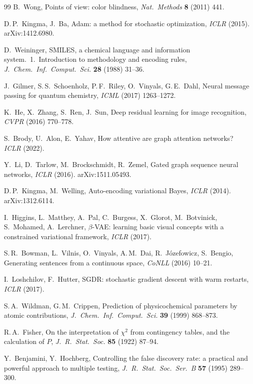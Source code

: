 \documentclass[10pt,a4paper,twocolumn]{article}
\begin{document}
\begin{thebibliography}{99}
B.~Wong,
Points of view: color blindness,
\textit{Nat.\ Methods} \textbf{8} (2011) 441.

D.\,P.~Kingma, J.~Ba,
Adam: a method for stochastic optimization,
\textit{ICLR} (2015). arXiv:1412.6980.

D.~Weininger,
SMILES, a chemical language and information system.\ 1.\ Introduction to methodology and encoding rules,
\textit{J.\ Chem.\ Inf.\ Comput.\ Sci.} \textbf{28} (1988) 31--36.

J.~Gilmer, S.\,S.~Schoenholz, P.\,F.~Riley, O.~Vinyals, G.\,E.~Dahl,
Neural message passing for quantum chemistry,
\textit{ICML} (2017) 1263--1272.

K.~He, X.~Zhang, S.~Ren, J.~Sun,
Deep residual learning for image recognition,
\textit{CVPR} (2016) 770--778.

S.~Brody, U.~Alon, E.~Yahav,
How attentive are graph attention networks?
\textit{ICLR} (2022).

Y.~Li, D.~Tarlow, M.~Brockschmidt, R.~Zemel,
Gated graph sequence neural networks,
\textit{ICLR} (2016). arXiv:1511.05493.

D.\,P.~Kingma, M.~Welling,
Auto-encoding variational Bayes,
\textit{ICLR} (2014). arXiv:1312.6114.

I.~Higgins, L.~Matthey, A.~Pal, C.~Burgess, X.~Glorot, M.~Botvinick, S.~Mohamed, A.~Lerchner,
$\beta$-{VAE}: learning basic visual concepts with a constrained variational framework,
\textit{ICLR} (2017).

S.\,R.~Bowman, L.~Vilnis, O.~Vinyals, A.\,M.~Dai, R.~J{\'o}zefowicz, S.~Bengio,
Generating sentences from a continuous space,
\textit{CoNLL} (2016) 10--21.

I.~Loshchilov, F.~Hutter,
{SGDR}: stochastic gradient descent with warm restarts,
\textit{ICLR} (2017).

S.\,A.~Wildman, G.\,M.~Crippen,
Prediction of physicochemical parameters by atomic contributions,
\textit{J.\ Chem.\ Inf.\ Comput.\ Sci.} \textbf{39} (1999) 868--873.

R.\,A.~Fisher,
On the interpretation of $\chi^2$ from contingency tables, and the calculation of $P$,
\textit{J.\ R.\ Stat.\ Soc.} \textbf{85} (1922) 87--94.

Y.~Benjamini, Y.~Hochberg,
Controlling the false discovery rate: a practical and powerful approach to multiple testing,
\textit{J.\ R.\ Stat.\ Soc.\ Ser.\ B} \textbf{57} (1995) 289--300.


\end{thebibliography}
\end{document}
